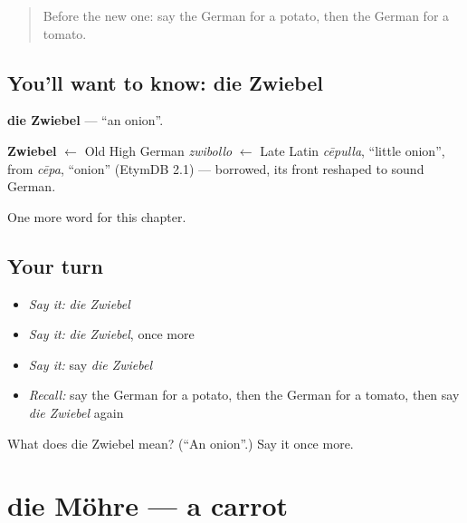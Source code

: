 \label{lesson:GE-C70-zwiebel}



\begin{quote}
Before the new one: say the German for a potato, then the German for a tomato.
\end{quote}

\subsection*{You'll want to know: die Zwiebel}
\textbf{die Zwiebel} — \textquotedblleft{}an onion\textquotedblright{}.

\begin{cousinweb}
\textbf{Zwiebel} $\leftarrow$ Old High German \emph{zwibollo} $\leftarrow$ Late Latin \emph{cēpulla}, \textquotedblleft{}little onion\textquotedblright{}, from \emph{cēpa}, \textquotedblleft{}onion\textquotedblright{} (EtymDB 2.1) — borrowed, its front reshaped to sound German.
\end{cousinweb}

\begin{grammarlens}[title={What you've built}]
One more word for this chapter.
\end{grammarlens}

\subsection*{Your turn}
\begin{itemize}
\raggedright
  \item \emph{Say it:} \emph{die Zwiebel}
  \item \emph{Say it:} \emph{die Zwiebel}, once more
  \item \emph{Say it:} say \emph{die Zwiebel}
  \item \emph{Recall:} say the German for a potato, then the German for a tomato, then say \emph{die Zwiebel} again
\end{itemize}

\begin{tcolorbox}[breakable,colback=teal!4,colframe=teal!35!black,title={Before you move on}]
What does die Zwiebel mean? (\textquotedblleft{}An onion\textquotedblright{}.) Say it once more.
\end{tcolorbox}
\section[die Möhre]{die Möhre — a carrot}

